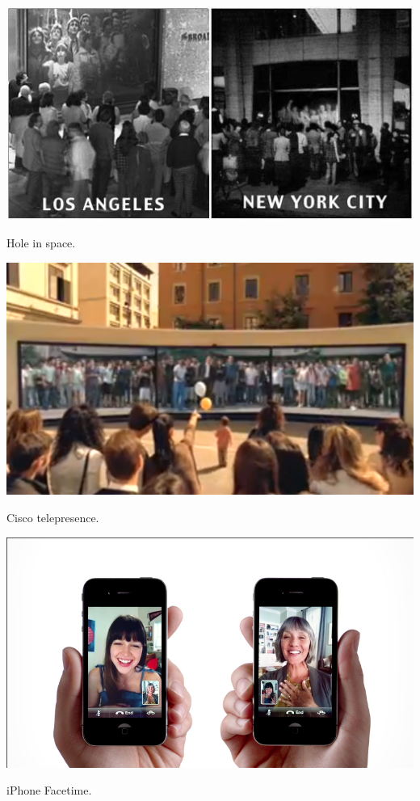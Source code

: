 \documentclass{tufte-handout}
\begin{document}
\begin{marginfigure}
	\includegraphics{figures/hole_in_space.jpg}
	\caption{Hole in space.}
	\label{fig:hole-in-space}
\end{marginfigure}

\begin{marginfigure}
	\includegraphics{figures/cisco-telepresence.png}
	\caption{Cisco telepresence.}
	\label{fig:cisco-telepresence}
\end{marginfigure}

\begin{marginfigure}
	\includegraphics{figures/iphone-face-to-face.png}
	\caption{iPhone Facetime.}
	\label{fig:facetime}
\end{marginfigure}
\end{document}
